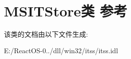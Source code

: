 \hypertarget{class_m_s_i_t_store}{}\section{M\+S\+I\+T\+Store类 参考}
\label{class_m_s_i_t_store}


该类的文档由以下文件生成\+:\begin{DoxyCompactItemize}
\item 
E\+:/\+React\+O\+S-\/0../dll/win32/itss/itss.\+idl\end{DoxyCompactItemize}
